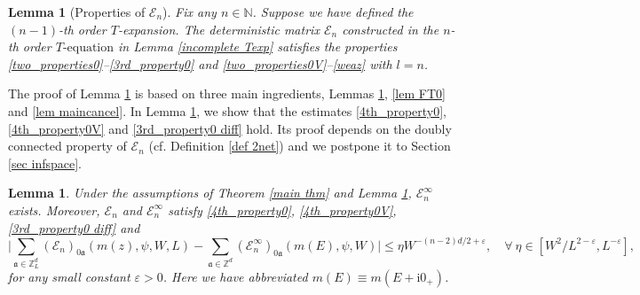 \documentclass{article}
\newcommand{\1}{\mathds{1}}
\numberwithin{equation}{section}
\newcommand{\be}{\begin{equation}}
\newcommand{\ee}{\end{equation}}
\newcommand{\e}{{\varepsilon}}
\newcommand{\fa}{{\mathfrak a}}
\newcommand{\ii}{\mathrm{i}} %
\renewcommand{\leq}{\leqslant}
\renewcommand{\le}{\leq}
\newcommand{\N}{\mathbb{N}}
\newcommand{\Z}{\mathbb{Z}}
\theoremstyle{plain} %
\newtheorem{lemma}[theorem]{Lemma}
\theoremstyle{remark}
\newcommand{\cor}{\color{red}}
\newcommand{\nc}{\normalcolor}
\newcommand{\Sele}{{\mathcal E}}
\newcommand{\incomp}{{\text{$T$-equation}}}
\newcommand{\hty}[1]{{\cor (ht: #1) }}
\begin{document}
\begin{lemma}[Properties of $\Sele_n$]\label{cancellation property}
 Fix any $n\in \N$. Suppose we have defined the $(n-1)$-th order $T$-expansion.  %
 The deterministic matrix $\Sele_n$ constructed in the $n$-th order $\incomp$ in Lemma \ref{incomplete Texp} satisfies the properties \eqref{two_properties0}--\eqref{3rd_property0} and \eqref{two_properties0V}--\eqref{weaz} with $l=n$.



 \end{lemma}
The proof of Lemma \ref{cancellation property} is based on three main ingredients, Lemmas \ref{lem V-R wt}, \ref{lem FT0} and \ref{lem maincancel}. In Lemma \ref{lem V-R wt}, we show that the estimates \eqref{4th_property0}, \eqref{4th_property0V} and \eqref{3rd_property0 diff} hold. %
Its proof depends on the doubly connected property of $\Sele_{n}$ (cf. Definition \ref{def 2net}) and we postpone it to Section \ref{sec infspace}. 

\begin{lemma} \label{lem V-R wt}%
Under the assumptions of Theorem \ref{main thm} and Lemma \ref{cancellation property}, $\Sele_n^{\infty}$ exists. Moreover, $\Sele_n$ and $\Sele_n^{\infty}$ satisfy \eqref{4th_property0}, \eqref{4th_property0V}, \eqref{3rd_property0 diff} and
 \be\label{property V-R wt}
 \bigg|\sum_{\fa\in \Z_L^d} ( \Sele_{n})_{0\fa} (m(z),\psi, W, L) - \sum_{\fa\in \Z^d} ( \Sele^{\infty}_{n})_{0\fa}(m(E), \psi, W)  \bigg|   \le \eta W^{-(n-2)d/2+\e},\quad \forall\ \eta\in[  W^{2}/L^{2-\e} ,L^{-\e}],
\ee
for any small constant $\e>0$. Here we have abbreviated $m(E)\equiv m(E+\ii 0_+)$. %
\end{lemma}
\end{document}
